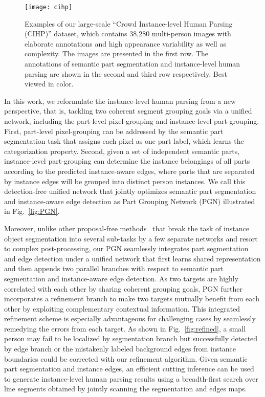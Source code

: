 \documentclass[runningheads]{llncs}
\begin{document}
\begin{figure*}[t]
\centering
  \texttt{[image: cihp]}
\vspace{-2mm}
\caption{Examples of our large-scale ``Crowd Instance-level Human Parsing (CIHP)'' dataset, which contains 38,280 multi-person images with elaborate annotations and high appearance variability as well as complexity. The images are presented in the first row. The annotations of semantic part segmentation and instance-level human parsing are shown in the second and third row respectively. Best viewed in color.}
\vspace{-6mm}
\label{fig:cihp}
\end{figure*}


In this work, we reformulate the instance-level human parsing from a new perspective, that is, tackling two coherent segment grouping goals via a unified network, including the part-level pixel-grouping and instance-level part-grouping. First, part-level pixel-grouping can be addressed by the semantic part segmentation task that assigns each pixel as one part label, which learns the categorization property. Second, given a set of independent semantic parts, instance-level part-grouping can determine the instance belongings of all parts according to the predicted instance-aware edges, where parts that are separated by instance edges will be grouped into distinct person instances. We call this detection-free unified network that jointly optimizes semantic part segmentation and instance-aware edge detection as Part Grouping Network (PGN) illustrated in Fig.~\ref{fig:PGN}.

Moreover, unlike other proposal-free methods~\cite{Liu_2017_ICCV,Kirillov_2017_CVPR,liang2015proposal} that break the task of instance object segmentation into several sub-tasks by a few separate networks and resort to complex post-processing, our PGN seamlessly integrates part segmentation and edge detection under a unified network that first learns shared representation and then appends two parallel branches with respect to semantic part segmentation and instance-aware edge detection. As two targets are highly correlated with each other by sharing coherent grouping goals, PGN further incorporates a refinement branch to make two targets mutually benefit from each other by exploiting complementary contextual information. This integrated refinement scheme is especially advantageous for challenging cases by seamlessly remedying the errors from each target. As shown in Fig.~\ref{fig:refined}, a small person may fail to be localized by segmentation branch but successfully detected by edge branch or the mistakenly labeled background edges from instance boundaries could be corrected with our refinement algorithm. Given semantic part segmentation and instance edges, an efficient cutting inference can be used to generate instance-level human parsing results using a breadth-first search over line segments obtained by jointly scanning the segmentation and edges maps.
\end{document}
